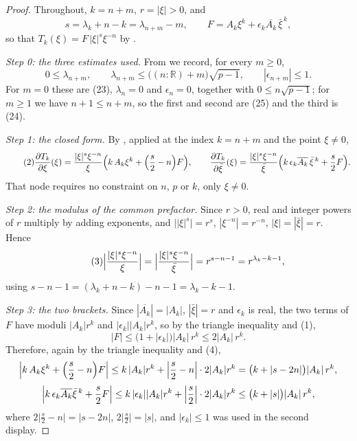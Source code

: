 \begin{proof}
Throughout, $k=n+m$, $r=|\xi|>0$, and
\[
  s=\lambda_k+n-k=\lambda_{n+m}-m,\qquad
  F=A_k\xi^{k}+\epsilon_k\overline{A_k}\,\bar\xi^{\,k},
\]
so that $T_k(\xi)=F\,|\xi|^{s}\xi^{-n}$ by .

\emph{Step 0: the three estimates used.}  From
 we record, for every $m\ge0$,
\begin{equation}\tag{1}
  0\le\lambda_{n+m},\qquad
  \lambda_{n+m}\le\bigl((n:\mathbb{R})+m\bigr)\sqrt{p-1},\qquad
  |\epsilon_{n+m}|\le1 .
\end{equation}
For $m=0$ these are (23), $\lambda_n=0$ and $\epsilon_n=0$, together with
$0\le n\sqrt{p-1}$; for $m\ge1$ we have $n+1\le n+m$, so the first and second
are (25) and the third is (24).

\emph{Step 1: the closed form.}  By , applied
at the index $k=n+m$ and the point $\xi\ne0$,
\begin{equation}\tag{2}
  \frac{\partial T_k}{\partial\xi}(\xi)
  =\frac{|\xi|^{s}\xi^{-n}}{\xi}
    \Bigl(k\,A_k\xi^{k}+\Bigl(\frac{s}{2}-n\Bigr)F\Bigr),
  \qquad
  \frac{\partial T_k}{\partial\bar\xi}(\xi)
  =\frac{|\xi|^{s}\xi^{-n}}{\bar\xi}
    \Bigl(k\,\epsilon_k\overline{A_k}\,\bar\xi^{\,k}+\frac{s}{2}F\Bigr).
\end{equation}
That node requires no constraint on $n$, $p$ or $k$, only $\xi\ne0$.

\emph{Step 2: the modulus of the common prefactor.}  Since $r>0$, real and
integer powers of $r$ multiply by adding exponents, and
$\bigl||\xi|^{s}\bigr|=r^{s}$, $|\xi^{-n}|=r^{-n}$, $|\xi|=|\bar\xi|=r$.  Hence
\begin{equation}\tag{3}
  \Bigl|\frac{|\xi|^{s}\xi^{-n}}{\xi}\Bigr|
  =\Bigl|\frac{|\xi|^{s}\xi^{-n}}{\bar\xi}\Bigr|
  =r^{s-n-1}=r^{\lambda_k-k-1},
\end{equation}
using $s-n-1=(\lambda_k+n-k)-n-1=\lambda_k-k-1$.

\emph{Step 3: the two brackets.}  Since $|\overline{A_k}|=|A_k|$,
$|\bar\xi|=r$ and $\epsilon_k$ is real, the two terms of $F$ have moduli
$|A_k|r^{k}$ and $|\epsilon_k||A_k|r^{k}$, so by the triangle inequality and
(1),
\begin{equation}\tag{4}
  |F|\le\bigl(1+|\epsilon_k|\bigr)|A_k|\,r^{k}\le2|A_k|\,r^{k}.
\end{equation}
Therefore, again by the triangle inequality and (4),
\[
  \Bigl|k\,A_k\xi^{k}+\Bigl(\frac{s}{2}-n\Bigr)F\Bigr|
  \le k\,|A_k|r^{k}+\Bigl|\frac{s}{2}-n\Bigr|\cdot2|A_k|r^{k}
  =\bigl(k+|s-2n|\bigr)|A_k|\,r^{k},
\]
\[
  \Bigl|k\,\epsilon_k\overline{A_k}\bar\xi^{\,k}+\frac{s}{2}F\Bigr|
  \le k\,|\epsilon_k||A_k|r^{k}+\Bigl|\frac{s}{2}\Bigr|\cdot2|A_k|r^{k}
  \le\bigl(k+|s|\bigr)|A_k|\,r^{k},
\]
where $2\bigl|\tfrac{s}{2}-n\bigr|=|s-2n|$, $2\bigl|\tfrac{s}{2}\bigr|=|s|$,
and $|\epsilon_k|\le1$ was used in the second display.


\end{proof}
